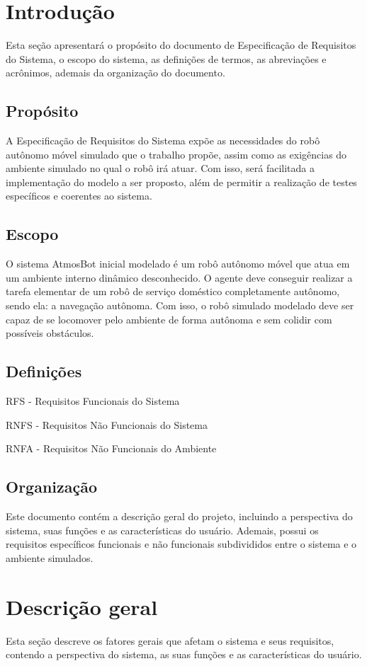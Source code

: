 \section{Introdução}
Esta seção apresentará o propósito do documento de Especificação de Requisitos do Sistema, o escopo do sistema, as definições de termos, as abreviações e acrônimos, ademais da organização do documento.

\subsection{Propósito}
A Especificação de Requisitos do Sistema expõe as necessidades do robô autônomo móvel simulado que o trabalho propõe, assim como as exigências do ambiente simulado no qual o robô irá atuar. Com isso, será facilitada a implementação do modelo a ser proposto, além de permitir a realização de testes específicos e coerentes ao sistema. 

\subsection{Escopo}
O sistema AtmosBot inicial modelado é um robô autônomo móvel que atua em um ambiente interno dinâmico desconhecido. O agente deve conseguir realizar a tarefa elementar de um robô de serviço doméstico completamente autônomo, sendo ela: a navegação autônoma. Com isso, o robô simulado modelado deve ser capaz de se locomover pelo ambiente de forma autônoma e sem colidir com possíveis obstáculos.

\subsection{Definições}

RFS - Requisitos Funcionais do Sistema

RNFS - Requisitos Não Funcionais do Sistema

RNFA - Requisitos Não Funcionais do Ambiente

\subsection{Organização}
Este documento contém a descrição geral do projeto, incluindo a perspectiva do sistema, suas funções e as características do usuário. Ademais, possui os requisitos específicos funcionais e não funcionais subdivididos entre o sistema e o ambiente simulados.

\section{Descrição geral}
Esta seção descreve os fatores gerais que afetam o sistema e seus requisitos, contendo a perspectiva do sistema, as suas funções e as características do usuário.

